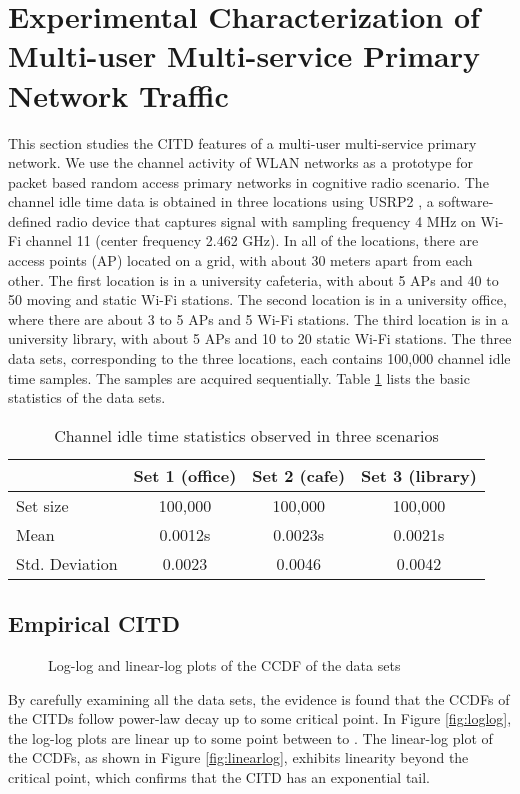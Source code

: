 \documentclass[10pt,final,journal,letterpaper]{IEEEtran}
\begin{document}
\section{Experimental Characterization of Multi-user Multi-service Primary Network Traffic}\label{sec:2}
This section studies the CITD features of a multi-user multi-service primary network. We use the channel activity of WLAN networks as a prototype for packet based random access primary networks in cognitive radio scenario. The channel idle time data is obtained in three locations using USRP2 \cite{kershaw2007kismet}, a software-defined radio device that captures signal with sampling frequency 4 MHz on Wi-Fi channel 11 (center frequency 2.462 GHz). In all of the locations, there are access points (AP) located on a grid, with about 30 meters apart from each other. The first location is in a university cafeteria, with about 5 APs and 40 to 50 moving and static Wi-Fi stations. The second location is in a university office, where there are about 3 to 5 APs and 5 Wi-Fi stations. The third location is in a university library, with about 5 APs and 10 to 20 static Wi-Fi stations. The three data sets, corresponding to the three locations, each contains 100,000 channel idle time samples. The samples are acquired sequentially. Table \ref{tb:dataset1} lists the basic statistics of the data sets.
\begin{table}[!t]
\centering
\caption{Channel idle time statistics observed in three scenarios}
  \begin{tabular}{ l || c | c | c   }
    \hline
     & Set 1 (office) & Set 2 (cafe) & Set 3 (library) \\ \hline \hline
    Set size & 100,000 & 100,000 & 100,000 \\ \hline
    Mean & 0.0012s & 0.0023s & 0.0021s \\ \hline
    Std. Deviation & 0.0023 & 0.0046 & 0.0042 \\
    \hline
  \end{tabular}\label{tb:dataset1}
\end{table}

\subsection{Empirical CITD}
\begin{figure*}[!t]
  \centering
  \caption{Log-log and linear-log plots of the CCDF of the data sets}
  \label{fig:logloglinearlog}
\end{figure*}
By carefully examining all the data sets, the evidence is found that the CCDFs of the CITDs follow power-law decay up to some critical point. In Figure \ref{fig:loglog}, the log-log plots are linear up to some point between  to . The linear-log plot of the CCDFs, as shown in Figure \ref{fig:linearlog}, exhibits linearity beyond the critical point, which confirms that the CITD has an exponential tail.
\end{document}
